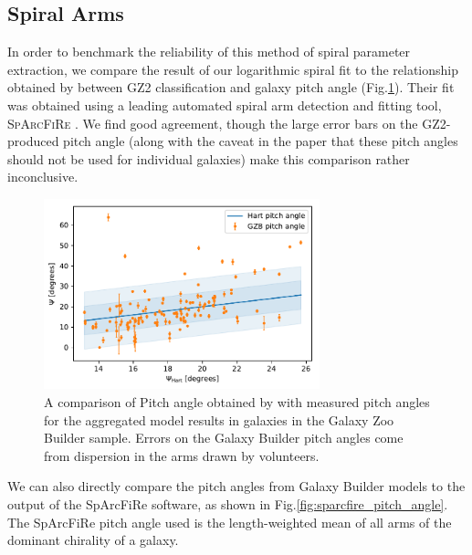 \documentclass[../main.tex]{subfiles}
\begin{document}




\subsection{Spiral Arms}

In order to benchmark the reliability of this method of spiral parameter extraction, we compare the result of our logarithmic spiral fit to the relationship obtained by \citet{Hart2016:1607.01019v1} between GZ2 classification and galaxy pitch angle (Fig.\ref{fig:hart_pitch_angle}). Their fit was obtained using a leading automated spiral arm detection and fitting tool, \textsc{SpArcFiRe} \citep{Davis2014:1402.1910v1}. We find good agreement, though the large error bars on the GZ2-produced pitch angle (along with the caveat in the paper that these pitch angles should not be used for individual galaxies) make this comparison rather inconclusive.

\begin{figure}
  \includegraphics[width=8cm]{images__results/pitch-angle-comparison.pdf}
  \caption{A comparison of Pitch angle obtained by \citet{Hart2016:1607.01019v1} with measured pitch angles for the aggregated model results in galaxies in the Galaxy Zoo Builder sample. Errors on the Galaxy Builder pitch angles come from dispersion in the arms drawn by volunteers.}
  \label{fig:hart_pitch_angle}
\end{figure}

We can also directly compare the pitch angles from Galaxy Builder models to the output of the SpArcFiRe software, as shown in Fig.\ref{fig:sparcfire_pitch_angle}. The SpArcFiRe pitch angle used is the length-weighted mean of all arms of the dominant chirality of a galaxy.
\end{document}
